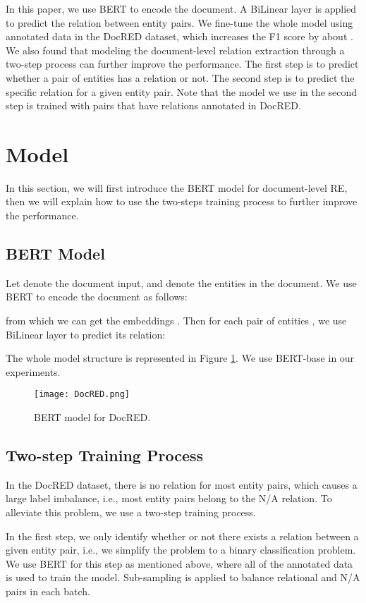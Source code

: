 \documentclass[11pt,a4paper]{article}
\begin{document}
In this paper, we use BERT to encode the document. A BiLinear layer is applied to predict the relation between entity pairs. We fine-tune the whole model using annotated data in the DocRED dataset, which increases the F1 score by about . We also found that modeling the document-level relation extraction through a two-step process can further improve the performance. The first step is to predict whether a pair of entities has a relation or not. The second step is to predict the specific relation for a given entity pair. Note that the model we use in the second step is trained with pairs that have relations annotated in DocRED.

\section{Model}
In this section, we will first introduce the BERT model for document-level RE, then we will explain how to use the two-steps training process to further improve the performance.

\subsection{BERT Model}
Let  denote the document input, and  denote the  entities in the document. We use BERT to encode the document as follows:

from which we can get the embeddings . Then for each pair of entities , we use BiLinear layer to predict its relation:

The whole model structure is represented in Figure \ref{fig:model}. We use BERT-base in our experiments. 

\begin{figure}
    \centering
    \texttt{[image: DocRED.png]}
    \caption{BERT model for DocRED.}
    \label{fig:model}
\end{figure}

\subsection{Two-step Training Process}
In the DocRED dataset, there is no relation for most entity pairs, which causes a large label imbalance, i.e., most entity pairs belong to the N/A relation. To alleviate this problem, we use a two-step training process.

In the first step, we only identify whether or not there exists a relation between a given entity pair, i.e., we simplify the problem to a binary classification problem. We use BERT for this step as mentioned above,  where all of the annotated data is used to train the model. Sub-sampling is applied to balance relational and N/A pairs in each batch.
\end{document}
